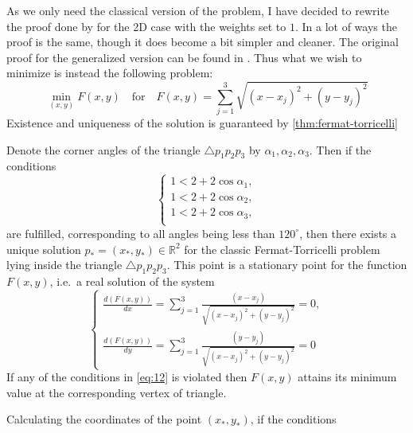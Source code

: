 As we only need the classical version of the problem, I have decided to rewrite
the proof done by \textcite{uteshev2014} for the 2D case with the weights set to
$1$. In a lot of ways the proof is the same, though it does become a bit
simpler and cleaner. The original proof for the generalized version can be found
in \textcite{uteshev2014}. Thus what we wish to minimize is instead the
following problem:
%
\begin{equation}
  \min_{(x,y)} F(x,y) \quad \text{for} \quad F(x,y) = \sum_{j=1}^3
  \sqrt{{(x-x_j)}^2 + {(y-y_j)}^2}
\end{equation}
%
Existence and uniqueness of the solution is guaranteed by
\cref{thm:fermat-torricelli}
%
\begin{theorem}
\label{thm:fermat-torricelli}
  Denote the corner angles of the triangle $\triangle p_1 p_2 p_3$ by $\alpha_1, \alpha_2,
  \alpha_3$. Then if the conditions
  \begin{equation}
    \label{eq:12}
    \left\{
      \begin{array}{c}
        1 < 2 + 2 \cos \alpha_1 , \\
        1 < 2 + 2 \cos \alpha_2 , \\
        1 < 2 + 2 \cos \alpha_3 , \\
      \end{array}
    \right.
  \end{equation}
  are fulfilled, corresponding to all angles being less than $120^{\circ}$, then
  there exists a unique solution $p_\ast = (x_\ast, y_\ast) \in \mathbb{R}^2$
  for the classic Fermat-Torricelli problem lying inside the triangle
  $\triangle p_1 p_2 p_3$. This point is a stationary point for the function
  $F(x,y)$, i.e.\ a real solution of the system
  \begin{equation}
    \label{eq:13}
    \left\{
      \begin{array}{c}
        \frac{d(F(x,y))}{dx} = \sum_{j=1}^3 \frac{(x-x_j)}{\sqrt{{(x-x_j)}^2 +
        {(y - y_j)}^2}} = 0, \\
        \frac{d(F(x,y))}{dy} = \sum_{j=1}^3 \frac{(y-y_j)}{\sqrt{{(x-x_j)}^2 +
        {(y - y_j)}^2}} = 0
      \end{array}
    \right.
  \end{equation}
  If any of the conditions in \cref{eq:12} is violated then $F(x,y)$ attains its
  minimum value at the corresponding vertex of triangle.
\end{theorem}
%
Calculating the coordinates of the point $(x_\ast, y_\ast)$, if the conditions
